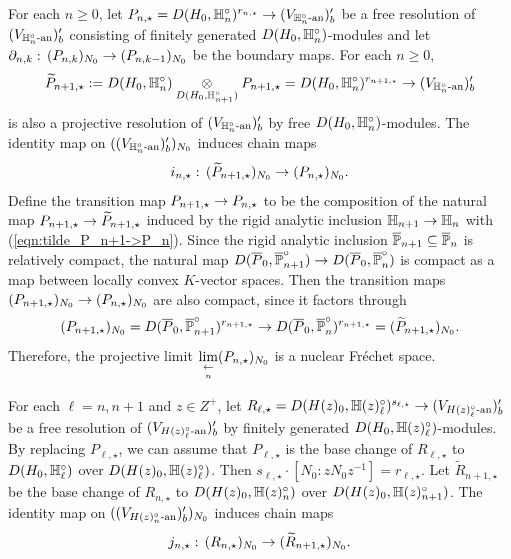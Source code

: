 \documentclass[10pt]{amsart}
\begin{document}
For each $n\geq 0$, let $P_{n,\star} = D(H_{0},\mathbb{H}_{n}^{\circ})^{r_{n,\star}} \rightarrow (V_{\mathbb{H}_{n}^{\circ}\textnormal{-an}})^{\prime}_{b}$ be a free resolution of $(V_{\mathbb{H}_{n}^{\circ}\textnormal{-an}})^{\prime}_{b}$ consisting of finitely generated $D(H_{0},\mathbb{H}_{n}^{\circ})$-modules and let $\partial_{n,k}:\,(P_{n,k})_{N_{0}}\rightarrow (P_{n,k-1})_{N_{0}}$ be the boundary maps. For each $n\geq 0$, \[
    \widetilde{P}_{n+1,\star}:=D(H_{0},\mathbb{H}_{n}^{\circ}) \underset{D(H_{0},\mathbb{H}_{n+1}^{\circ})}{\otimes} P_{n+1,\star} = D(H_{0},\mathbb{H}_{n}^{\circ})^{r_{n+1,\star}} \rightarrow (V_{\mathbb{H}_{n}^{\circ}\textnormal{-an}})^{\prime}_{b} 
\] is also a projective resolution of $(V_{\mathbb{H}_{n}^{\circ}\textnormal{-an}})^{\prime}_{b}$ by free $D(H_{0},\mathbb{H}_{n}^{\circ})$-modules. The identity map on $((V_{\mathbb{H}_{n}^{\circ}\textnormal{-an}})^{\prime}_{b})_{N_{0}}$ induces chain maps \begin{equation}\label{eqn:tilde_P_n+1->P_n}
    i_{n,\star}:\,(\widetilde{P}_{n+1,\star})_{N_{0}}\rightarrow (P_{n,\star})_{N_{0}}.
\end{equation} Define the transition map $P_{n+1,\star}\rightarrow P_{n,\star}$ to be the composition of the natural map $P_{n+1,\star}\rightarrow \widetilde{P}_{n+1,\star}$ induced by the rigid analytic inclusion $\mathbb{H}_{n+1}\rightarrow \mathbb{H}_{n}$ with (\ref{eqn:tilde_P_n+1->P_n}). Since the rigid analytic inclusion $\overline{\mathbb{P}}_{n+1}\subseteq\overline{\mathbb{P}}_{n}$ is relatively compact, the natural map $D(\overline{P}_{0},\overline{\mathbb{P}}_{n+1}^{\circ})\rightarrow D(\overline{P}_{0},\overline{\mathbb{P}}_{n}^{\circ})$ is compact as a map between locally convex $K$-vector spaces. Then the transition maps $(P_{n+1,\star})_{N_{0}}\rightarrow (P_{n,\star})_{N_{0}}$ are also compact, since it factors through \[
    (P_{n+1,\star})_{N_{0}} = D(\overline{P}_{0},\overline{\mathbb{P}}_{n+1}^{\circ})^{r_{n+1,\star}} \rightarrow D(\overline{P}_{0},\overline{\mathbb{P}}_{n}^{\circ})^{r_{n+1,\star}} = (\widetilde{P}_{n+1,\star})_{N_{0}}.
\] Therefore, the projective limit $\underset{\underset{n}{\leftarrow}}{\lim}(P_{n,\star})_{N_{0}}$ is a nuclear Fr\'echet space. 

For each $\ell=n,n+1$ and $z\in Z^{+}$, let $R_{\ell,\star} = D(H(z)_{0},\mathbb{H}(z)_{\ell}^{\circ})^{s_{\ell,\star}} \rightarrow (V_{H(z)_{\ell}^{\circ}\textnormal{-an}})^\prime_{b}$ be a free resolution of $(V_{H(z)_{\ell}^{\circ}\textnormal{-an}})^\prime_{b}$ by finitely generated $D(H_{0},\mathbb{H}(z)_{\ell}^{\circ})$-modules. By replacing $P_{\ell,\star}$, we can assume that $P_{\ell,\star}$ is the base change of $R_{\ell,\star}$ to $D(H_{0},\mathbb{H}_{\ell}^{\circ})$ over $D(H(z)_{0},\mathbb{H}(z)_{\ell}^{\circ})$. Then $s_{\ell,\star}\cdot[N_{0}:zN_{0}z^{-1}]=r_{\ell,\star}$. Let $\widetilde{R}_{n+1,\star}$ be the base change of $R_{n,\star}$ to $D(H(z)_{0},\mathbb{H}(z)_{n}^{\circ})$ over $D(H(z)_{0},\mathbb{H}(z)_{n+1}^{\circ})$. The identity map on $((V_{H(z)_{n}^{\circ}\textnormal{-an}})^\prime_{b})_{N_{0}}$ induces chain maps \begin{equation}\label{eqn:tilde_R_n+1->R_n}
    j_{n,\star}:\,(R_{n,\star})_{N_{0}}\rightarrow (\widetilde{R}_{n+1,\star})_{N_{0}}.
\end{equation} 
\end{document}
